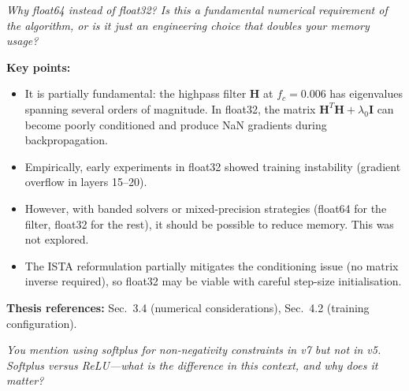 \documentclass[11pt, letterpaper]{article}
\newcounter{qcounter}
\newcommand{\question}[1]{%
  \stepcounter{qcounter}%
  \begin{questionbox}[Q\theqcounter]%
    \itshape #1%
  \end{questionbox}%
}
\begin{document}
\question{Why float64 instead of float32?  Is this a fundamental numerical
requirement of the algorithm, or is it just an engineering choice
that doubles your memory usage?}

\begin{answerbox}
\textbf{Key points:}
\begin{itemize}[nosep]
  \item It is partially fundamental: the highpass filter $\mathbf{H}$
        at $f_c{=}0.006$ has eigenvalues spanning several orders of
        magnitude.  In float32, the matrix
        $\mathbf{H}^T\mathbf{H} + \lambda_0 \mathbf{I}$ can become
        poorly conditioned and produce NaN gradients during
        backpropagation.
  \item Empirically, early experiments in float32 showed training
        instability (gradient overflow in layers 15--20).
  \item However, with banded solvers or mixed-precision strategies
        (float64 for the filter, float32 for the rest), it should be
        possible to reduce memory.  This was not explored.
  \item The ISTA reformulation partially mitigates the conditioning
        issue (no matrix inverse required), so float32 may be viable
        with careful step-size initialisation.
\end{itemize}
\textbf{Thesis references:} Sec.~3.4 (numerical considerations), Sec.~4.2 (training configuration).
\end{answerbox}

\question{You mention using softplus for non-negativity constraints in v7
but not in v5.  Softplus versus ReLU---what is the difference in
this context, and why does it matter?}
\end{document}
